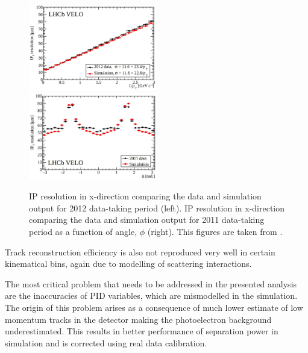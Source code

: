 \begin{figure}[!h]
	\centering
	\includegraphics[width = 0.5\textwidth]{figs/detector/IPres.eps}%
	\includegraphics[width = 0.5\textwidth]{figs/detector/IPresAngle.eps}%
	\caption{\Gls{IP} resolution in x-direction comparing the data and simulation output for 2012 data-taking period (left). \Gls{IP} resolution in x-direction comparing the data and simulation output for 2011 data-taking period as a function of angle, $\phi$ (right). This figures are taken from \cite{LHCbVELOGroup:2014uea}. }  
	\label{fig:IPRES}
\end{figure}


Track reconstruction efficiency is also not reproduced very well in certain kinematical bins, again due to modelling of scattering interactions.

The most critical problem that needs to be addressed in the presented analysis are the inaccuracies of \Gls{PID} variables, which are mismodelled in the simulation. The origin of this problem arises as a consequence of much lower estimate of low momentum tracks in the detector making the photoelectron background underestimated. This results in better performance of separation power in simulation and is corrected using real data calibration.


